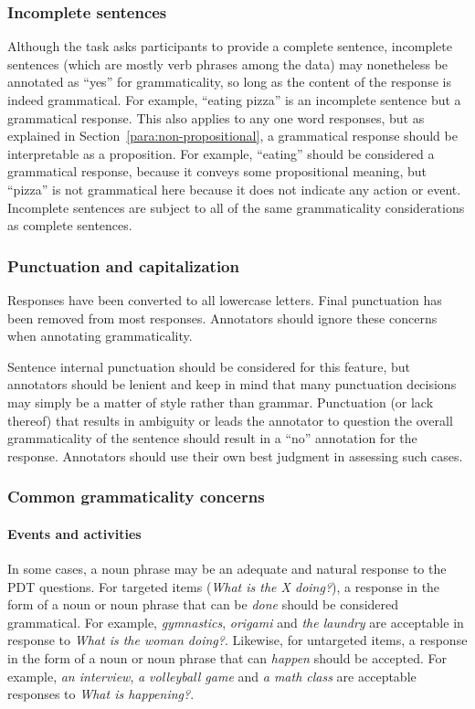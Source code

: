 \documentclass[12pt,notitlepage]{article}
\begin{document}
\subsubsection{Incomplete sentences} \label{subsubsec:gram-incomplete-sentences} Although the task asks participants to provide a complete sentence, incomplete sentences (which are mostly verb phrases among the data) may nonetheless be annotated as ``yes'' for grammaticality, so long as the content of the response is indeed grammatical. For example, ``eating pizza'' is an incomplete sentence but a grammatical response. This also applies to any one word responses, but as explained in Section~\ref{para:non-propositional}, a grammatical response should be interpretable as a proposition. For example, ``eating'' should be considered a grammatical response, because it conveys some propositional meaning, but ``pizza'' is not grammatical here because it does not indicate any action or event. Incomplete sentences are subject to all of the same grammaticality considerations as complete sentences.

\subsubsection{Punctuation and capitalization} Responses have been converted to all lowercase letters. Final punctuation has been removed from most responses. Annotators should ignore these concerns when annotating grammaticality. 

Sentence internal punctuation should be considered for this feature, but annotators should be lenient and keep in mind that many punctuation decisions may simply be a matter of style rather than grammar. Punctuation (or lack thereof) that results in ambiguity or leads the annotator to question the overall grammaticality of the sentence should result in a ``no'' annotation for the response. Annotators should use their own best judgment in assessing such cases.

\subsubsection{Common grammaticality concerns}

\paragraph{Events and activities}
\label{para:gram-events} In some cases, a noun phrase may be an adequate and natural response to the PDT questions. For targeted items (\textit{What is the X doing?}), a response in the form of a noun or noun phrase that can be \textit{done} should be considered grammatical. For example, \textit{gymnastics}, \textit{origami} and \textit{the laundry} are acceptable in response to \textit{What is the woman doing?}. Likewise, for untargeted items, a response in the form of a noun or noun phrase that can \textit{happen} should be accepted. For example, \textit{an interview}, \textit{a volleyball game} and \textit{a math class} are acceptable responses to \textit{What is happening?}.
\end{document}
